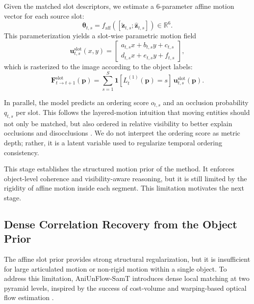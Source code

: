 Given the matched slot descriptors, we estimate a 6-parameter affine motion vector for each source slot:
\begin{equation}
\boldsymbol{\theta}_{t,s} = f_{\mathrm{aff}}\left([\tilde{\mathbf{z}}_{t,s};\hat{\mathbf{z}}_{t,s}]\right) \in \mathbb{R}^{6}.
\end{equation}
This parameterization yields a slot-wise parametric motion field
\begin{equation}
\mathbf{u}_{t,s}^{\mathrm{slot}}(x,y) =
\begin{bmatrix}
a_{t,s}x + b_{t,s}y + c_{t,s}\\
d_{t,s}x + e_{t,s}y + f_{t,s}
\end{bmatrix},
\end{equation}
which is rasterized to the image according to the object labels:
\begin{equation}
\mathbf{F}^{\mathrm{slot}}_{t\rightarrow t+1}(\mathbf{p}) = \sum_{s=1}^{S} \mathbf{1}[L_t^{(1)}(\mathbf{p})=s] \, \mathbf{u}_{t,s}^{\mathrm{slot}}(\mathbf{p}).
\end{equation}

In parallel, the model predicts an ordering score $o_{t,s}$ and an occlusion probability $q_{t,s}$ per slot. This follows the layered-motion intuition that moving entities should not only be matched, but also ordered in relative visibility to better explain occlusions and disocclusions \cite{wang1994representing,sevillalara2016optical}. We do not interpret the ordering score as metric depth; rather, it is a latent variable used to regularize temporal ordering consistency.

This stage establishes the structured motion prior of the method. It enforces object-level coherence and visibility-aware reasoning, but it is still limited by the rigidity of affine motion inside each segment. This limitation motivates the next stage.

\subsection{Dense Correlation Recovery from the Object Prior}

The affine slot prior provides strong structural regularization, but it is insufficient for large articulated motion or non-rigid motion within a single object. To address this limitation, AniUnFlow-SamT introduces dense local matching at two pyramid levels, inspired by the success of cost-volume and warping-based optical flow estimation \cite{pwcnet,raft,flowformer}.

